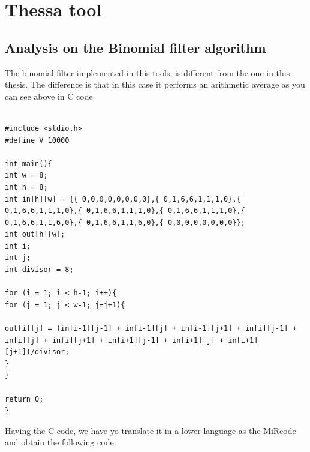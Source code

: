 \chapter{Thessa tool}
\section{Analysis on the Binomial filter algorithm}

The binomial filter implemented in this tools, is different from the one in this thesis.
The difference is that in this case it performs an arithmetic average as you can see above in C code
\lstset{ %
	language=C,
	basicstyle=\footnotesize,
	numbers=left,
	stepnumber=1,
	showstringspaces=false,
	tabsize=1,
	breaklines=true,
	breakatwhitespace=false,
}

\begin{lstlisting}[frame=single]  % Start your 

#include <stdio.h>
#define V 10000

int main(){
int w = 8;
int h = 8;
int in[h][w] = {{ 0,0,0,0,0,0,0,0},{ 0,1,6,6,1,1,1,0},{ 0,1,6,6,1,1,1,0},{ 0,1,6,6,1,1,1,0},{ 0,1,6,6,1,1,1,0},{ 0,1,6,6,1,1,6,0},{ 0,1,6,6,1,1,6,0},{ 0,0,0,0,0,0,0,0}};
int out[h][w];
int i;
int j;
int divisor = 8;

for (i = 1; i < h-1; i++){
for (j = 1; j < w-1; j=j+1){

out[i][j] = (in[i-1][j-1] + in[i-1][j] + in[i-1][j+1] + in[i][j-1] + in[i][j] + in[i][j+1] + in[i+1][j-1] + in[i+1][j] + in[i+1][j+1])/divisor;
}
}

return 0;
}
\end{lstlisting}
Having the C code, we have yo translate it in a lower language as the MiRcode and obtain the following code.

